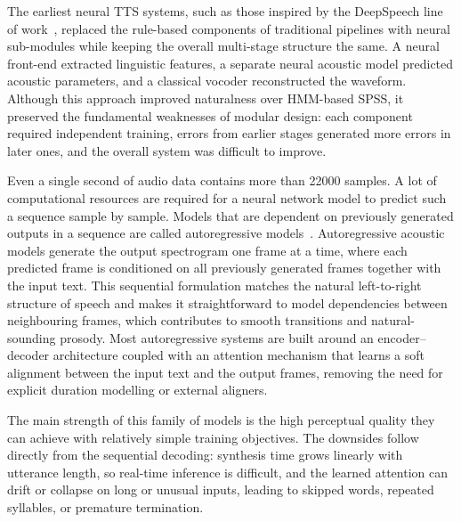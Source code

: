 \documentclass[
         english, %
    monochrome, %
]{VUMIFSEMasterThesis}
\begin{document}
The earliest neural TTS systems, such as those inspired by the DeepSpeech line of work~\cite{hannun2014deep}, replaced the rule-based components of traditional pipelines with neural sub-modules while keeping the overall multi-stage structure the same.
A neural front-end extracted linguistic features, a separate neural acoustic model predicted acoustic parameters, and a classical vocoder reconstructed the waveform.
Although this approach improved naturalness over HMM-based SPSS, it preserved the fundamental weaknesses of modular design:
each component required independent training, errors from earlier stages generated more errors in later ones, and the overall system was difficult to improve.


Even a single second of audio data contains more than 22000 samples.
A lot of computational resources are required for a neural network model to predict such a sequence sample by sample.
Models that are dependent on previously generated outputs in a sequence are called autoregressive models~\cite{akaike1971autoregressive}.
Autoregressive acoustic models generate the output spectrogram one frame at a time, where each predicted frame is conditioned on all previously generated frames together with the input text.
This sequential formulation matches the natural left-to-right structure of speech and makes it straightforward to model dependencies between neighbouring frames, which contributes to smooth transitions and natural-sounding prosody.
Most autoregressive systems are built around an encoder--decoder architecture coupled with an attention mechanism that learns a soft alignment between the input text and the output frames, removing the need for explicit duration modelling or external aligners.

The main strength of this family of models is the high perceptual quality they can achieve with relatively simple training objectives.
The downsides follow directly from the sequential decoding: synthesis time grows linearly with utterance length, so real-time inference is difficult, and the learned attention can drift or collapse on long or unusual inputs, leading to skipped words, repeated syllables, or premature termination.
\end{document}
